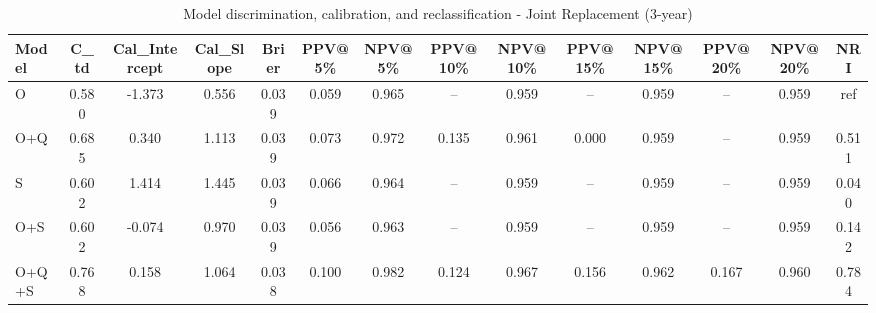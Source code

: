 \begin{table}[htbp]
\centering
\small
\caption{Model discrimination, calibration, and reclassification - Joint Replacement (3-year)}
\label{tab:perf_joint_3y}
\begin{tabular}{lccccccccccccc}
\toprule
Model & C\_td & Cal\_Intercept & Cal\_Slope & Brier & PPV@5\% & NPV@5\% & PPV@10\% & NPV@10\% & PPV@15\% & NPV@15\% & PPV@20\% & NPV@20\% & NRI \\
\midrule
O & 0.580 & -1.373 & 0.556 & 0.039 & 0.059 & 0.965 & -- & 0.959 & -- & 0.959 & -- & 0.959 & ref \\
O+Q & 0.685 & 0.340 & 1.113 & 0.039 & 0.073 & 0.972 & 0.135 & 0.961 & 0.000 & 0.959 & -- & 0.959 & 0.511 \\
S & 0.602 & 1.414 & 1.445 & 0.039 & 0.066 & 0.964 & -- & 0.959 & -- & 0.959 & -- & 0.959 & 0.040 \\
O+S & 0.602 & -0.074 & 0.970 & 0.039 & 0.056 & 0.963 & -- & 0.959 & -- & 0.959 & -- & 0.959 & 0.142 \\
O+Q+S & 0.768 & 0.158 & 1.064 & 0.038 & 0.100 & 0.982 & 0.124 & 0.967 & 0.156 & 0.962 & 0.167 & 0.960 & 0.784 \\
\bottomrule
\end{tabular}
\end{table}